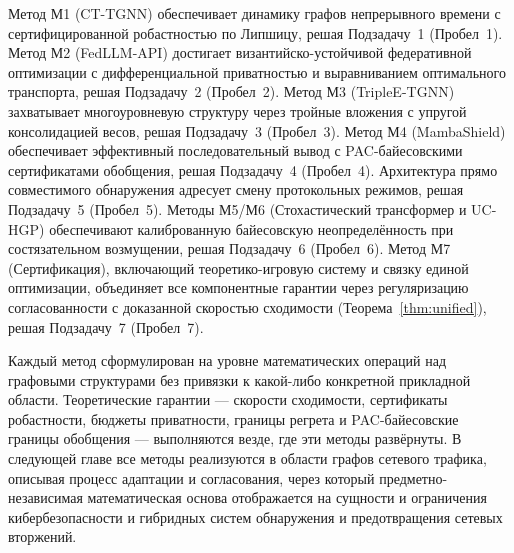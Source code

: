 Метод М1 (CT-TGNN) обеспечивает динамику графов непрерывного времени с сертифицированной робастностью по Липшицу, решая Подзадачу~1 (Пробел~1). Метод М2 (FedLLM-API) достигает византийско-устойчивой федеративной оптимизации с дифференциальной приватностью и выравниванием оптимального транспорта, решая Подзадачу~2 (Пробел~2). Метод М3 (TripleE-TGNN) захватывает многоуровневую структуру через тройные вложения с упругой консолидацией весов, решая Подзадачу~3 (Пробел~3). Метод М4 (MambaShield) обеспечивает эффективный последовательный вывод с PAC-байесовскими сертификатами обобщения, решая Подзадачу~4 (Пробел~4). Архитектура прямо совместимого обнаружения адресует смену протокольных режимов, решая Подзадачу~5 (Пробел~5). Методы М5/М6 (Стохастический трансформер и UC-HGP) обеспечивают калиброванную байесовскую неопределённость при состязательном возмущении, решая Подзадачу~6 (Пробел~6). Метод М7 (Сертификация), включающий теоретико-игровую систему и связку единой оптимизации, объединяет все компонентные гарантии через регуляризацию согласованности с доказанной скоростью сходимости (Теорема~\ref{thm:unified}), решая Подзадачу~7 (Пробел~7).

Каждый метод сформулирован на уровне математических операций над графовыми структурами без привязки к какой-либо конкретной прикладной области. Теоретические гарантии --- скорости сходимости, сертификаты робастности, бюджеты приватности, границы регрета и PAC-байесовские границы обобщения --- выполняются везде, где эти методы развёрнуты. В следующей главе все методы реализуются в области графов сетевого трафика, описывая процесс адаптации и согласования, через который предметно-независимая математическая основа отображается на сущности и ограничения кибербезопасности и гибридных систем обнаружения и предотвращения сетевых вторжений.


